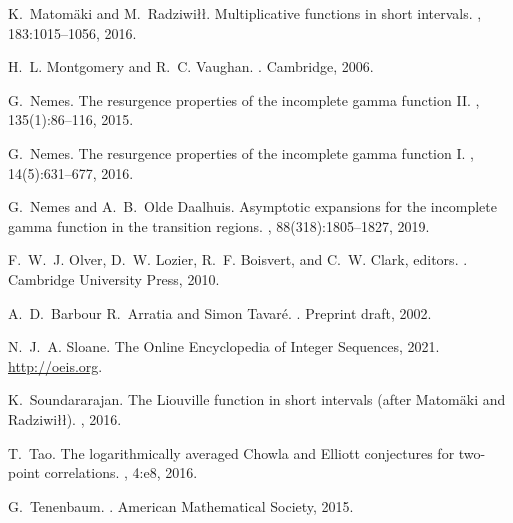 \documentclass[11pt,reqno,a4letter]{article}
\numberwithin{equation}{section}
\numberwithin{figure}{section}
\numberwithin{table}{section}
\theoremstyle{plain}
\numberwithin{theorem}{section}
\theoremstyle{definition}
\begin{document}
\begin{thebibliography}{10}
K.~Matom{\"{a}}ki and M.~Radziwi{\l\l}.
\newblock Multiplicative functions in short intervals.
, 183:1015--1056, 2016.

H.~L. Montgomery and R.~C. Vaughan.
.
\newblock Cambridge, 2006.

G.~Nemes.
\newblock The resurgence properties of the incomplete gamma function {II}.
, 135(1):86--116, 2015.

G.~Nemes.
\newblock The resurgence properties of the incomplete gamma function {I}.
, 14(5):631--677, 2016.

G.~Nemes and A.~B.~Olde Daalhuis.
\newblock Asymptotic expansions for the incomplete gamma function in the
  transition regions.
, 88(318):1805--1827, 2019.

F.~W.~J. Olver, D.~W. Lozier, R.~F. Boisvert, and C.~W. Clark, editors.
.
\newblock Cambridge University Press, 2010.

A.~D.~Barbour R.~Arratia and Simon Tavar{\'{e}}.
.
\newblock Preprint draft, 2002.

N.~J.~A. Sloane.
\newblock The {O}nline {E}ncyclopedia of {I}nteger {S}equences, 2021.
\newblock \url{http://oeis.org}.

K.~Soundararajan.
\newblock The {L}iouville function in short intervals (after {M}atom{\"{a}}ki
  and {R}adziwi{\l}{\l}).
, 2016.

T.~Tao.
\newblock The logarithmically averaged {C}howla and {E}lliott conjectures for
  two-point correlations.
, 4:e8, 2016.

G.~Tenenbaum.
.
\newblock American Mathematical Society, 2015.

\end{thebibliography}

\appendix
{}
\setcounter{section}{0} 
\renewcommand{\thesection}{\Alph{section}} 
\end{document}
